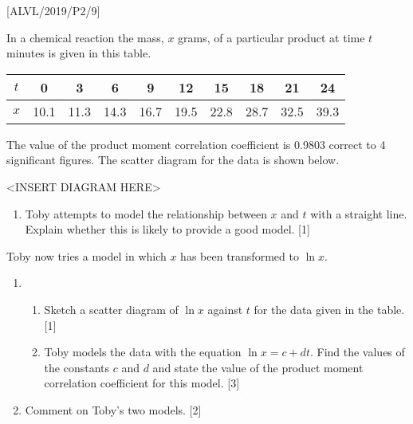 \item {[}ALVL/2019/P2/9{]} 

In a chemical reaction the mass, $x$ grams, of a particular product
at time $t$ minutes is given in this table. 
\noindent \begin{center}
\begin{tabular}{|c|c|c|c|c|c|c|c|c|c|}
\hline 
$t$ & 0 & 3 & 6 & 9 & 12 & 15 & 18 & 21 & 24\tabularnewline
\hline 
$x$ & 10.1 & 11.3 & 14.3 & 16.7 & 19.5 & 22.8 & 28.7 & 32.5 & 39.3\tabularnewline
\hline 
\end{tabular}
\par\end{center}

The value of the product moment correlation coefficient is 0.9803
correct to 4 significant figures. The scatter diagram for the data
is shown below. 
\noindent \begin{center}
\textless INSERT DIAGRAM HERE\textgreater{}
\par\end{center}
\begin{enumerate}
\item Toby attempts to model the relationship between $x$ and $t$ with
a straight line. Explain whether this is likely to provide a good
model. \hfill{} {[}1{]}
\end{enumerate}
Toby now tries a model in which $x$ has been transformed to $\ln x$. 
\begin{enumerate}
\item {}
\begin{enumerate}
\item Sketch a scatter diagram of $\ln x$ against $t$ for the data given
in the table. \hfill{} {[}1{]}
\item Toby models the data with the equation $\ln x=c+dt$. Find the values
of the constants $c$ and $d$ and state the value of the product
moment correlation coefficient for this model. \hfill{}{[}3{]}
\end{enumerate}
\item Comment on Toby\textquoteright s two models. \hfill{}{[}2{]}
\end{enumerate}
